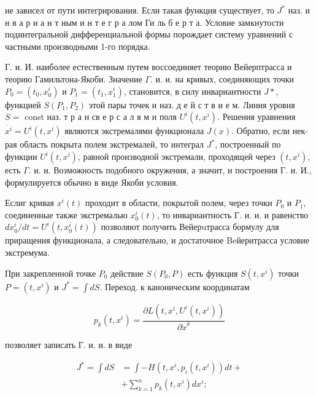 \documentclass[10pt]{article}
\begin{document}
не зависел от пути интегрирования. Если такая функция существует, то $J^{*}$ наз. и н в а р и а н т ным и н т е г р а лом Ги ль б е р т а. Условие замкнутости подинтегральной дифференциальной формы порождает систему уравнений с частными производными 1-го порядка.



Г. и. И. наиболее естественным путем воссоединяет теорию Вейерптрасса и теорию Гамильтона-Якоби. Значение $\Gamma$. и. и. на кривых, соединяющих точки $P_{0}=\left(t_{0}, x_{0}^{i}\right)$ и $P_{1}=\left(t_{1}, x_{1}^{i}\right)$, становится, в силу инвариантности $J *$, функцией $S\left(P_{1}, P_{2}\right)$ этой пары точек и наз. д е й с т в и е м. Линия уровня $S=$ const наз. т р а н св е р с а л я м и поля $U^{i}\left(t, x^{i}\right)$. Решения уравнения $\ddot{x^{i}}=U^{i}\left(t, x^{i}\right)$ являются экстремалями функционала $J(x)$. Обратно, если нек-рая область покрыта полем экстремалей, то интеграл $J^{*}$, построенный по функции $U^{i}\left(t, x^{i}\right)$, равной производной экстремали, проходящей через $\left(t, x^{i}\right)$, есть $\Gamma$. и. и. Возможность подобного окружения, а значит, и построения Г. и. И., формулируется обычно в виде Якоби условия.



Еслиг кривая $x^{i}(t)$ проходит в области, покрытой полем, через точки $P_{0}$ и $P_{1}$, соединенные также экстремалью $x_{0}^{i}(t)$, то инвариантность $Г$. и. и. и равенство $d x_{0}^{i} / d t=U^{i}\left(t, x_{0}^{i}(t)\right)$ позволяют получить Вейерuтрасса бормулу для приращения функционала, а следовательно, и достаточное Beйеритрасса условие экстремума.



При закрепленной точке $P_{0}$ действие $S\left(P_{0}, P\right)$ есть функция $S\left(t, x^{i}\right)$ точки $P=\left(t, x^{i}\right)$ и $J^{*}=\int d S$. Переход. к каноническим координатам



\[

p_{k}\left(t, x^{i}\right)=\frac{\partial L\left(t, x^{i}, U^{i}\left(t, x^{i}\right)\right)}{\partial \dot{x}^{k}}

\]



позволяет записать Г. и. и. в виде



\[

\begin{aligned}

J^{*}=\int d S & =\int-H\left(t, x^{i}, p_{i}\left(t, x^{i}\right)\right) d t+ \\

& +\sum_{k=1}^{n} p_{k}\left(t, x^{i}\right) d x^{i} ;

\end{aligned}

\]
\end{document}
